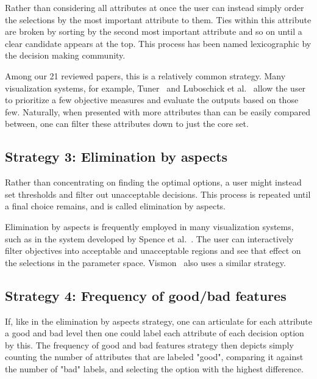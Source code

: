 Rather than considering all attributes at once the user can instead simply
order the selections by the most important attribute to them. Ties within this
attribute are broken by sorting by the second most important attribute and so
on until a clear candidate appears at the top. This process has been named
lexicographic by the decision making community.

Among our 21 reviewed papers, this is a relatively common strategy.
Many visualization systems, for example, Tuner~\cite{Torsney-Weir:2011} and
Luboschick et al.~\citep{Luboschik:2014} allow the user to prioritize a few
objective measures and evaluate the outputs based on those few. Naturally,
when presented with more attributes than can be easily compared between,
one can filter
these attributes down to just the core set. 

\subsection{Strategy 3: Elimination by aspects}\label{elimination-by-aspects}

Rather than concentrating on finding the optimal options, a user might
instead set thresholds and filter out unacceptable decisions. This process
is repeated until a final choice remains, and is called
elimination by aspects.

Elimination by aspects is frequently employed in many visualization systems, 
such as in the system developed by Spence et al.~\citep{Spence:1995}. The user can interactively filter
objectives into acceptable and unacceptable regions and
see that effect on the selections in the parameter space. 
Vismon~\citep{Booshehrian:2012} also uses a similar strategy.

\subsection{Strategy 4: Frequency of good/bad features}
\label{frequency-of-goodbad-features}

If, like in the elimination by aspects strategy, one can articulate for
each attribute a good and bad level then one could label each attribute
of each decision option by this. The frequency of good and bad features strategy 
then depicts simply counting the number of
attributes that are labeled "good",  comparing it against the number of
"bad" labels, and selecting the option with the highest difference. 

